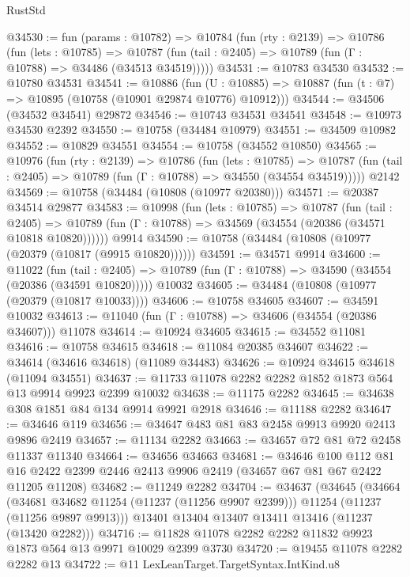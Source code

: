 \begin{lexlean}{RustStd}
\begin{coremodule}
@34530 := fun (params : @10782) =>
  @10784
    (fun (rty : @2139) =>
    @10786
      (fun (lets : @10785) =>
      @10787 (fun (tail : @2405) => @10789 (fun (Γ : @10788) => @34486 (@34513 @34519)))))
@34531 := @10783 @34530
@34532 := @10780 @34531
@34541 := @10886
    (fun (U : @10885) => @10887 (fun (t : @7) => @10895 (@10758 (@10901 @29874 @10776) @10912)))
@34544 := @34506 (@34532 @34541) @29872
@34546 := @10743 @34531 @34541
@34548 := @10973 @34530 @2392
@34550 := @10758 (@34484 @10979)
@34551 := @34509 @10982
@34552 := @10829 @34551
@34554 := @10758 (@34552 @10850)
@34565 := @10976
    (fun (rty : @2139) =>
    @10786
      (fun (lets : @10785) =>
      @10787 (fun (tail : @2405) => @10789 (fun (Γ : @10788) => @34550 (@34554 @34519)))))
    @2142
@34569 := @10758 (@34484 (@10808 (@10977 @20380)))
@34571 := @20387 @34514 @29877
@34583 := @10998
    (fun (lets : @10785) =>
    @10787
      (fun (tail : @2405) =>
      @10789 (fun (Γ : @10788) => @34569 (@34554 (@20386 (@34571 @10818 @10820))))))
    @9914
@34590 := @10758 (@34484 (@10808 (@10977 (@20379 (@10817 (@9915 @10820))))))
@34591 := @34571 @9914
@34600 := @11022
    (fun (tail : @2405) => @10789 (fun (Γ : @10788) => @34590 (@34554 (@20386 (@34591 @10820)))))
    @10032
@34605 := @34484 (@10808 (@10977 (@20379 (@10817 @10033))))
@34606 := @10758 @34605
@34607 := @34591 @10032
@34613 := @11040 (fun (Γ : @10788) => @34606 (@34554 (@20386 @34607))) @11078
@34614 := @10924 @34605
@34615 := @34552 @11081
@34616 := @10758 @34615
@34618 := @11084 @20385 @34607
@34622 := @34614 (@34616 @34618) (@11089 @34483)
@34626 := @10924 @34615 @34618 (@11094 @34551)
@34637 := @11733 @11078 @2282 @2282 @1852 @1873 @564 @13 @9914 @9923 @2399 @10032
@34638 := @11175 @2282
@34645 := @34638 @308 @1851 @84 @134 @9914 @9921 @2918
@34646 := @11188 @2282
@34647 := @34646 @119
@34656 := @34647 @483 @81 @83 @2458 @9913 @9920 @2413 @9896 @2419
@34657 := @11134 @2282
@34663 := @34657 @72 @81 @72 @2458 @11337 @11340
@34664 := @34656 @34663
@34681 := @34646
    @100
    @112
    @81
    @16
    @2422
    @2399
    @2446
    @2413
    @9906
    @2419
    (@34657 @67 @81 @67 @2422 @11205 @11208)
@34682 := @11249 @2282
@34704 := @34637
    (@34645
      (@34664
        (@34681 @34682 @11254 (@11237 (@11256 @9907 @2399)))
        @11254
        (@11237 (@11256 @9897 @9913)))
      @13401
      @13404
      @13407
      @13411
      @13416
      (@11237 (@13420 @2282)))
@34716 := @11828 @11078 @2282 @2282 @11832 @9923 @1873 @564 @13 @9971 @10029 @2399 @3730
@34720 := @19455 @11078 @2282 @2282 @13
@34722 := @11 LexLeanTarget.TargetSyntax.IntKind.u8

\end{coremodule}
\end{lexlean}
